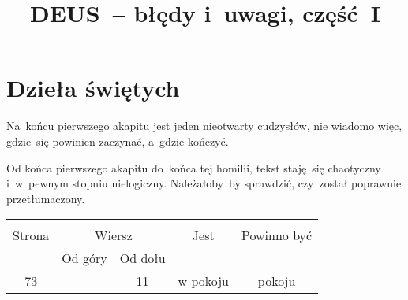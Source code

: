 \documentclass[a4paper,11pt]{article}
\title{DEUS~-- błędy i~uwagi, część~I}
\begin{document}





\maketitle  %





\section{Dzieła świętych}

\vspace{\spaceTwo}







\start {} Na~końcu pierwszego akapitu jest jeden nieotwarty
cudzysłów, nie wiadomo więc, gdzie~się powinien zaczynać, a~gdzie
kończyć.

\vspace{\spaceFour}



\start {} Od końca pierwszego akapitu do~końca tej homilii,
tekst staję~się chaotyczny i~w~pewnym stopniu nielogiczny.
Należałoby~by sprawdzić, czy~został poprawnie przetłumaczony.







\begin{center}

  \begin{tabular}{|c|c|c|c|c|}
    \hline
    & \multicolumn{2}{c|}{} & & \\
    Strona & \multicolumn{2}{c|}{Wiersz} & Jest
                              & Powinno być \\ \cline{2-3}
    & Od góry & Od dołu & & \\
    \hline
    73 & & 11 & w pokoju & pokoju \\
    \hline
  \end{tabular}

\end{center}
\end{document}
